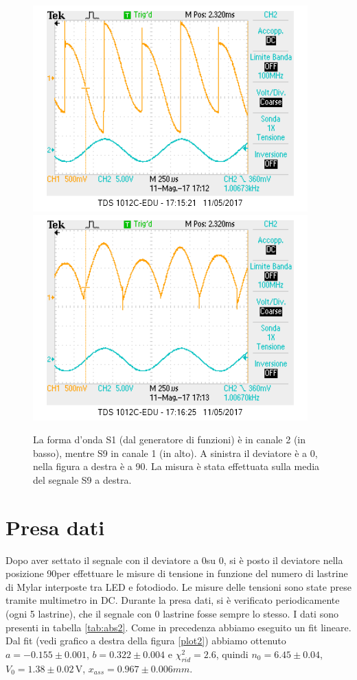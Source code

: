 \documentclass[10pt,a4paper]{article}
\begin{document}
\begin{figure}[!htb]
  \centering
  \includegraphics[scale=0.45]{dev0ch1S9-ch2S1(zero).png}\includegraphics[scale=0.45]{dev90ch1S9-ch2S1(zero).png}
\caption{La forma d'onda S1 (dal generatore di funzioni) è in canale 2 (in basso), mentre S9 in canale 1 (in alto). A sinistra il deviatore è a 0\degree, nella figura a destra è a 90\degree. La misura è stata effettuata sulla media del segnale S9 a destra. \label{osc:S9(zero)}}
\end{figure}

\section{Presa dati}
Dopo aver settato il segnale con il deviatore a 0\degree su 0, si è posto il deviatore nella posizione 90\degree per effettuare le misure di tensione in funzione del numero di lastrine di Mylar interposte tra LED e fotodiodo.
Le misure delle tensioni sono state prese tramite multimetro in DC. Durante la presa dati, si è verificato periodicamente (ogni 5 lastrine), che il segnale con 0 lastrine fosse sempre lo stesso. I dati sono presenti in tabella \ref{tab:abs2}. Come in precedenza abbiamo eseguito un fit lineare.
Dal fit (vedi grafico a destra della figura \ref{plot2}) abbiamo ottenuto $a=-0.155\pm0.001$, $b=0.322\pm0.004$ e $\chi^2_{rid}=2.6$, quindi $n_0= 6.45\pm 0.04$, $V_0=1.38\pm0.02\,\mbox{V}$, $x_{ass}=0.967\pm0.006{mm}$.
\end{document}
